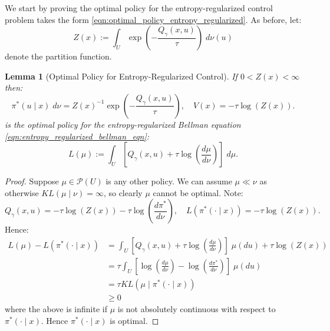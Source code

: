 \documentclass[11pt,oneside,reqno]{article}
\theoremstyle{plain}
\newtheorem{lemma}[theorem]{Lemma}
\theoremstyle{definition}
\numberwithin{equation}{section}
\renewcommand{\geq}{\geqslant}
\begin{document}
We start by proving the optimal policy for the entropy-regularized 
control problem takes the form \eqref{eqn:optimal_policy_entropy_regularized}. As before, let:
%
\[Z(x) := \int_U \exp\left(-\frac{Q_\gamma(x,u)}{\tau}\right) \; d\nu(u)\]
%
\noindent denote the partition function.
%
\begin{lemma}[Optimal Policy for Entropy-Regularized Control]
	If $0 < Z(x) < \infty$ then: 
		\[\pi^*(u \mid x) \; d\nu = Z(x)^{-1}\exp\left(-\frac{Q_\gamma(x,u)}{\tau} \right), \quad V(x) = -\tau \log(Z(x)).\]
	is the optimal policy for the entropy-regularized Bellman equation \eqref{eqn:entropy_regularized_bellman_eqn}:
	\[L(\mu) := \int_U \left[Q_\gamma(x,u) + \tau \log\left(\frac{d\mu}{d\nu}\right)\right] \;  d\mu.\]
\end{lemma}
%
\begin{proof}
	Suppose $\mu \in \mathcal{P}(U)$ is any other policy. We can assume $\mu \ll \nu$ as otherwise 
	$KL(\mu \mid \nu) = \infty$, so clearly $\mu$ cannot be optimal. Note:
	\[Q_\gamma(x,u) = -\tau \log (Z(x)) - \tau \log\left(\frac{d\pi^*}{d\nu}\right), \quad L(\pi^*(\cdot \mid x)) = -\tau \log(Z(x)). \]
	\noindent Hence: 
	\begin{align*}
		L(\mu) - L(\pi^*(\cdot \mid x)) & = \int_U \left[Q_\gamma(x,u) + \tau \log\left(\frac{d\mu}{d\nu}\right)\right] \; \mu(du) + \tau \log(Z(x))\\
		& = \tau \int_U \left[\log\left(\frac{d\mu}{d\nu}\right) - \log\left(\frac{d\pi^*}{d\nu}\right)\right] \; \mu(du)\\
		& = \tau KL(\mu \mid \pi^*(\cdot \mid x))\\
		& \geq 0
	\end{align*}
	\noindent where the above is infinite if $\mu$ is not absolutely continuous with respect to $\pi^*(\cdot \mid x)$. Hence $\pi^*(\cdot \mid x)$ is optimal.
\end{proof}
\end{document}
